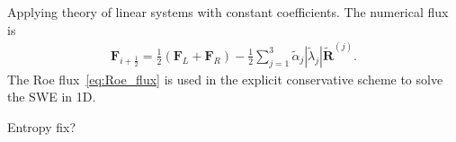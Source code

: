 Applying theory of linear systems with constant coefficients.
The numerical flux is
\begin{align}\label{eq:Roe_flux}
    \mathbf{F}_{i+\frac{1}{2}} = \frac{1}{2} \left( \mathbf{F}_L + \mathbf{F}_R \right) - \frac{1}{2} \sum_{j=1}^3 \tilde{\alpha}_j \left| \tilde{\lambda}_j \right| \tilde{\mathbf{R}}^{(j)}.
\end{align}
The Roe flux~\eqref{eq:Roe_flux} is used in the explicit conservative scheme to solve the SWE in 1D.

Entropy fix?

